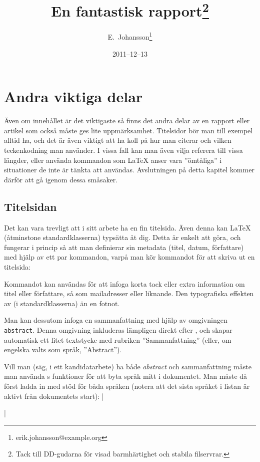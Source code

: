 \documentclass[10pt,../../a4.tex]{subfiles}
\begin{document}
\section{Andra viktiga delar}
Även om innehållet är det viktigaste så finns det andra delar av en
rapport eller artikel som också måste ges lite uppmärksamhet.
Titelsidor bör man till exempel alltid ha, och det är även viktigt att ha 
koll på
hur man citerar och vilken teckenkodning man använder. I vissa fall
kan man även vilja referera till vissa längder, eller använda kommandon
som \LaTeX{} anser vara ”ömtåliga” i situationer de inte är tänkta att
användas. Avslutningen på detta kapitel kommer därför att gå igenom dessa
småsaker.

\subsection{Titelsidan}%
Det kan vara trevligt att i sitt arbete ha en fin titelsida. Även denna
kan \LaTeX{} (åtminstone standardklasserna) typsätta åt dig. Detta är
enkelt att göra, och fungerar i princip så att man definierar sin
metadata (titel, datum, författare) med hjälp av ett par kommandon, varpå
man kör kommandot  för att skriva ut en titelsida:
\begin{latexcode}
\title{En fantastisk rapport\thanks{Tack till DD-gudarna
   för visad barmhärtighet och stabila filservrar.}}
\date{2011--12--13}
\author{E.~Johansson\thanks{erik.johansson@example.org}}
\maketitle
\end{latexcode}

Kommandot  kan användas för att infoga korta tack eller extra
information om titel eller författare, så som mailadresser eller
liknande. Den typografiska effekten av  (i standardklasserna)
än en fotnot.

Man kan dessutom infoga en sammanfattning  med hjälp av
omgivningen \texttt{abstract}. Denna omgivning inkluderas lämpligen direkt
efter , och skapar automatisk ett litet textstycke med
rubriken ”Sammanfattning” (eller, om engelska valts som språk,
”Abstract”).

Vill man (säg, i ett kandidatarbete) ha både \emph{abstract} och
sammanfattning måste man använda s funktioner för att byta
språk mitt i dokumentet. Man måste då först ladda in  med stöd 
för båda språken (notera att det sista språket i listan är aktivt från
dokumentets start):
\latex|\usepackage[english,swedish]{babel}|
\end{document}
